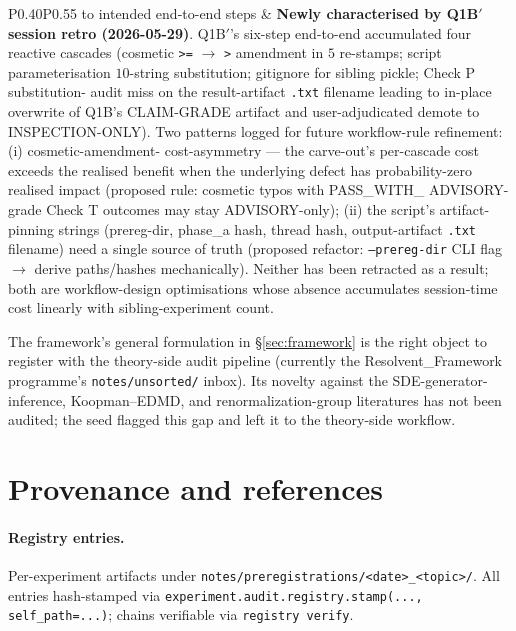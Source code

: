 \documentclass[11pt]{article}
\theoremstyle{definition}
\theoremstyle{plain}
\begin{document}
\begin{longtable}{P{0.40\textwidth}P{0.55\textwidth}}
to intended end-to-end steps
& \textbf{Newly characterised by Q1B$'$ session retro
(2026-05-29)}. Q1B$'$'s six-step end-to-end accumulated four
reactive cascades (cosmetic \texttt{>=} $\to$ \texttt{>}
amendment in $5$ re-stamps; script parameterisation $10$-string
substitution; gitignore for sibling pickle; Check P substitution-
audit miss on the result-artifact \texttt{.txt} filename leading
to in-place overwrite of Q1B's CLAIM-GRADE artifact and
user-adjudicated demote to INSPECTION-ONLY). Two patterns logged
for future workflow-rule refinement: (i) cosmetic-amendment-
cost-asymmetry --- the carve-out's per-cascade cost exceeds the
realised benefit when the underlying defect has probability-zero
realised impact (proposed rule: cosmetic typos with PASS\_WITH\_
ADVISORY-grade Check T outcomes may stay ADVISORY-only); (ii)
the script's artifact-pinning strings (prereg-dir, phase\_a
hash, thread hash, output-artifact \texttt{.txt} filename) need
a single source of truth (proposed refactor: \texttt{--prereg-dir}
CLI flag $\to$ derive paths/hashes mechanically). Neither has
been retracted as a result; both are workflow-design
optimisations whose absence accumulates session-time cost
linearly with sibling-experiment count. \\
\end{longtable}

The framework's general formulation in \S\ref{sec:framework} is
the right object to register with the theory-side audit pipeline
(currently the Resolvent\_Framework programme's
\verb|notes/unsorted/| inbox). Its novelty against the
SDE-generator-inference, Koopman--EDMD, and renormalization-group
literatures has not been audited; the seed flagged this gap and
left it to the theory-side workflow.

\appendix

\section{Provenance and references}
\label{app:provenance}

\paragraph{Registry entries.}
Per-experiment artifacts under
\verb|notes/preregistrations/<date>_<topic>/|. All entries
hash-stamped via \verb|experiment.audit.registry.stamp(...,| \verb|self_path=...)|;
chains verifiable via \verb|registry verify|.
\end{document}

